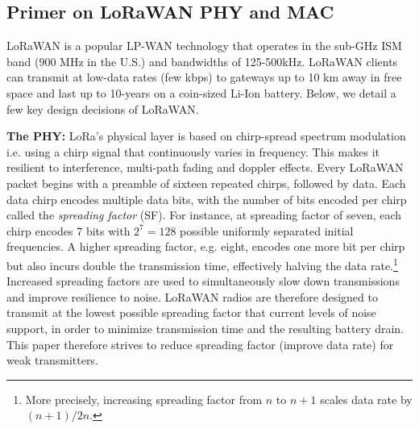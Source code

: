 \subsection{Primer on LoRaWAN PHY and MAC}
\label{sec:lora}

LoRaWAN is a popular LP-WAN technology that operates in the sub-GHz ISM band (900 MHz in the U.S.) and bandwidths of 125-500kHz. LoRaWAN clients can transmit at low-data rates (few kbps) to gateways up to 10 km away in free space and last up to 10-years on a coin-sized Li-Ion battery. Below, we detail a few key design decisions of LoRaWAN.\vspace*{0.02in}

\noindent \textbf{The PHY: } LoRa's physical layer is based on chirp-spread spectrum modulation i.e. using a chirp signal that continuously varies in frequency. This makes  it resilient to interference, multi-path fading and doppler effects. Every LoRaWAN packet begins with a preamble of sixteen repeated chirps, followed by data. Each data chirp encodes multiple data bits, with the number of  bits encoded per chirp called the \textit{spreading factor} (SF). For instance, at spreading factor of seven, each chirp encodes 7 bits with $2^7 = 128$ possible uniformly separated initial frequencies. A higher spreading factor, e.g. eight, encodes one more bit per chirp but also incurs double the transmission time, effectively halving the data rate.\footnote{More precisely, increasing spreading factor from $n$ to $n+1$ scales data rate by $(n+1)/2n$.} Increased spreading factors are used to simultaneously slow down transmissions and improve resilience to noise. LoRaWAN radios are therefore designed to transmit at the lowest possible spreading factor that current levels of noise support, in order to minimize transmission time and the resulting battery drain. This paper therefore strives to reduce spreading factor (improve data rate) for weak transmitters. 




